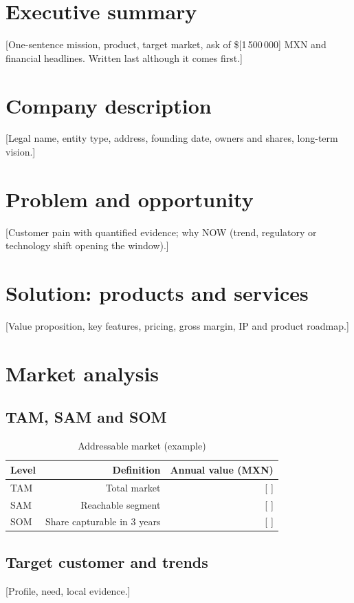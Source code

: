 \documentclass[12pt]{article}
\newcommand{\MontoSolicitado}{[1\,500\,000]}
\newcommand{\Moneda}{MXN}
\begin{document}

\tableofcontents
\newpage

\section{Executive summary}
[One-sentence mission, product, target market, ask of \$\MontoSolicitado{}
\Moneda{} and financial headlines. Written last although it comes first.]

\section{Company description}
[Legal name, entity type, address, founding date, owners and shares,
long-term vision.]

\section{Problem and opportunity}
[Customer pain with quantified evidence; why NOW (trend, regulatory or
technology shift opening the window).]

\section{Solution: products and services}
[Value proposition, key features, pricing, gross margin, IP and product
roadmap.]

\section{Market analysis}
\subsection{TAM, SAM and SOM}
\begin{table}[h]
  \centering
  \caption{Addressable market (example)}
  \begin{tabular}{lrr}
    \toprule
    Level & Definition & Annual value (\Moneda{}) \\
    \midrule
    TAM & Total market & [ ] \\
    SAM & Reachable segment & [ ] \\
    SOM & Share capturable in 3 years & [ ] \\
    \bottomrule
  \end{tabular}
\end{table}
\subsection{Target customer and trends}
[Profile, need, local evidence.]
\end{document}
